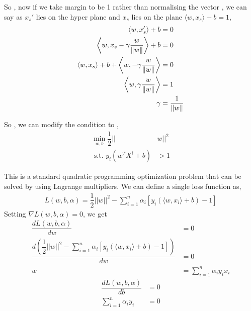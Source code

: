\documentclass[12pt,a4paper]{article}
\begin{document}
{So , now if we take margin to be 1 rather than normalising the vector , we can say as $x_s'$ lies on the hyper plane and $x_s$ lies on the plane $\langle w,x_s \rangle + b = 1$, 
\begin{align*}
    \langle w,x'_s\rangle + b &= 0\\
    \bigg\langle w,x_s-\gamma{w\over \|w\|}\bigg\rangle + b &= 0\\ \langle w,x_s\rangle + b + \bigg\langle w,-\gamma{w\over \|w\|}\bigg\rangle &= 0\\ 
    \bigg\langle w,\gamma{w\over \|w\|}\bigg\rangle &= 1\\
    \gamma &={1\over \|w\|}
\end{align*}

So , we can modify the condition to ,
\begin{align*}
    \min_{w,b} \dfrac{1}{2}||&w||^2 \\ 
    \text{    s.t.   }  y_i(w^{T}X^i + b) &> 1  
\end{align*}

This is a standard quadratic programming optimization problem that can be solved by using Lagrange
multipliers. We can define a single loss function as,
\begin{align*}
    L(w,b,\alpha) = \dfrac{1}{2}||w||^2 - \sum_{i=1}^n \alpha_i [y_i(\langle w,x_i\rangle +b)-1]
\end{align*}
Setting $\nabla L(w, b, \alpha) = 0$, we get
\begin{align*}
    \dfrac{dL(w, b, \alpha)}{dw} &= 0 \\
    \dfrac{d\left(\dfrac{1}{2}||w||^2 - \sum_{i=1}^n \alpha_i [y_i(\langle w,x_i\rangle +b)-1]\right)}{dw} &= 0 \\
    w &= \sum_{i=1}^n\alpha_iy_ix_i
\end{align*}
\begin{align*}
    \dfrac{dL(w, b, \alpha)}{db} &= 0 \\
    \sum_{i=1}^n\alpha_iy_i &= 0
\end{align*}

}
\end{document}
